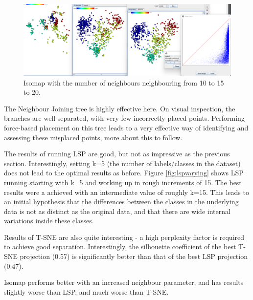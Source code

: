 \documentclass[ 10pt ]{fphw}
\begin{document}
\begin{center}
\begin{figure}[H]
    \centering
	\includegraphics[width=0.85\columnwidth]{isoMap10-15-20.png} 
	\caption{Isomap with the number of neighbours neighbouring from 10 to 15 to 20.}
	\label{fig:isomaptext}
	\end{figure}
\end{center}


The Neighbour Joining tree is highly effective here. On visual inspection, the branches are well separated, with very few incorrectly placed points. Performing force-based placement on this tree leads to a very effective way of identifying and assessing these misplaced points, more about this to follow.

The results of running LSP are good, but not as impressive as the previous section. Interestingly, setting k=5 (the number of labels/classes in the dataset) does not lead to the optimal results as before. Figure \ref{fig:lspvarying} shows LSP running starting with k=5 and working up in rough increments of 15. The best results were a achieved with an intermediate value of roughly k=15. This leads to an initial hypothesis that the differences between the classes in the underlying data is not as distinct as the original data, and that there are wide internal variations inside these classes.

Results of T-SNE are also quite interesting - a high perplexity factor is required to achieve good separation. Interestingly, the silhouette coefficient of the best T-SNE projection (0.57) is significantly better than that of the best LSP projection (0.47).

Isomap performs better with an increased neighbour parameter, and has results slightly worse than LSP, and much worse than T-SNE.
\end{document}
